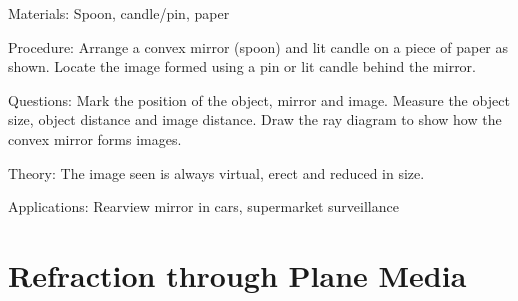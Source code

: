 \begin{multicols}{2}
\begin{description*}
\item[Materials:]{Spoon, candle/pin, paper}
\item[Procedure:]{Arrange a convex mirror (spoon) and lit candle on a piece of paper as shown. Locate the image formed using a pin or lit candle behind the mirror.}
\item[Questions:]{Mark the position of the object, mirror and image. Measure the object size, object distance and image distance. Draw the ray diagram to show how the convex mirror forms images.}
\item[Theory:]{The image seen is always virtual, erect and reduced in size.}
\item[Applications:]{Rearview mirror in cars, supermarket surveillance}
\end{description*}

%
%


\section*{Refraction through Plane Media}



\end{multicols}
